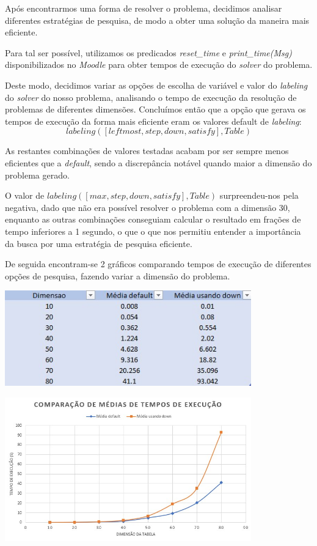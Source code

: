 \documentclass[11pt]{article}
\begin{document}
Após encontrarmos uma forma de resolver o problema, decidimos analisar diferentes estratégias de pesquisa, de modo a obter uma solução da maneira mais eficiente.

Para tal ser possível, utilizamos os predicados \emph{reset\_time} e \emph{print\_time(Msg)} disponibilizados no \emph{Moodle} para obter tempos de execução do \emph{solver} do problema.

Deste modo, decidimos variar as opções de escolha de variável e valor do \emph{labeling} do \emph{solver} do nosso problema, analisando o tempo de execução da resolução de problemas de diferentes dimensões.
Concluímos então que a opção que gerava os tempos de execução da forma mais eficiente eram os valores default de \emph{labeling}:  \[labeling([leftmost, step, down, satisfy],Table)\]

As restantes combinações de valores testadas acabam por ser sempre menos eficientes que a \emph{default}, sendo a discrepância notável quando maior a dimensão do problema gerado.

O valor de \(labeling([max, step, down, satisfy],Table)\) surpreendeu-nos pela negativa, dado que não era possível resolver o problema com a dimensão 30, enquanto as outras combinações conseguiam calcular o resultado em frações de tempo inferiores a 1 segundo, o que o que nos permitiu entender a importância da busca por uma estratégia de pesquisa eficiente.

De seguida encontram-se 2 gráficos comparando tempos de execução de diferentes opções de pesquisa, fazendo variar a dimensão do problema.

\bigskip

\begin{center}

	\includegraphics[width=0.8\textwidth]{tabela-comparacao.jpg}

	\includegraphics[width=0.8\textwidth]{grafico-comparacao.jpg}

\end{center}
\end{document}
